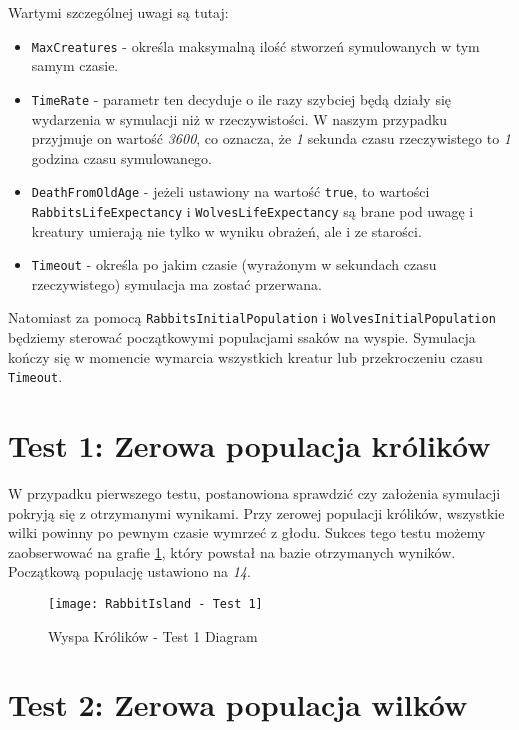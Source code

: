 Wartymi szczególnej uwagi są tutaj:
\begin{itemize}
	\item \texttt{MaxCreatures} - określa maksymalną ilość stworzeń symulowanych w tym samym czasie.
	\item \texttt{TimeRate} - parametr ten decyduje o ile razy szybciej będą działy się wydarzenia w symulacji niż w rzeczywistości. W naszym przypadku przyjmuje on wartość \emph{3600}, co oznacza, że \emph{1} sekunda czasu rzeczywistego to \emph{1} godzina czasu symulowanego.
	\item \texttt{DeathFromOldAge} - jeżeli ustawiony na wartość \texttt{true}, to wartości \texttt{RabbitsLifeExpectancy} i \texttt{WolvesLifeExpectancy} są brane pod uwagę i kreatury umierają nie tylko w wyniku obrażeń, ale i ze starości.
	\item \texttt{Timeout} - określa po jakim czasie (wyrażonym w sekundach czasu rzeczywistego) symulacja ma zostać przerwana.
\end{itemize}

Natomiast za pomocą \texttt{RabbitsInitialPopulation} i \texttt{WolvesInitialPopulation} będziemy sterować początkowymi populacjami ssaków na wyspie. Symulacja kończy się w momencie wymarcia wszystkich kreatur lub przekroczeniu czasu \texttt{Timeout}.

\section{Test 1: Zerowa populacja królików}

\par W przypadku pierwszego testu, postanowiona sprawdzić czy założenia symulacji pokryją się z otrzymanymi wynikami. Przy zerowej populacji królików, wszystkie wilki powinny po pewnym czasie wymrzeć z głodu. Sukces tego testu możemy zaobserwować na grafie \ref{fig:rabbitIslandTest1Diagram1}, który powstał na bazie otrzymanych wyników. Początkową populację ustawiono na \emph{14}.

\begin{figure}
	\texttt{[image: RabbitIsland - Test 1]}
	\caption{Wyspa Królików - Test 1 Diagram}
	\label{fig:rabbitIslandTest1Diagram1}
\end{figure}

\section{Test 2: Zerowa populacja wilków}

